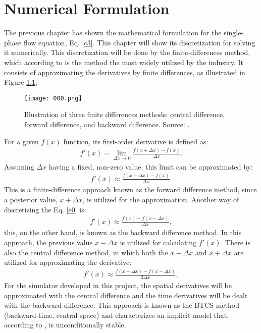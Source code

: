 \chapter{Numerical Formulation}
\label{chapter:NF}
The previous chapter has shown the mathematical formulation for the single-phase flow equation, Eq. \ref{c3}. This chapter will show its discretization for solving it numerically. This discretization will be done by the finite-differences method, which according to \cite{Ertekin2001} is the method the most widely utilized by the industry. It consists of approximating the derivatives by finite differences, as illustrated in Figure \ref{fig:000};
\begin{figure}[H]
	\centering
	\texttt{[image: 000.png]}\\
	\caption{Illustration of three finite differences methods: central difference, forward difference, and backward difference. Source: \cite{Heinzl1977}.}
	\label{fig:000}
\end{figure}
\noindent
For a given $f(x)$ function, its first-order derivative is defined as:
\begin{align}
\label{e0}
f'(x) = \lim_{\Delta x \to 0}\frac{f(x+\Delta x)-f(x)}{\Delta x}.
\end{align}
Assuming $\Delta x$ having a fixed, non-zero value, this limit can be approximated by:
\begin{align}
\label{e00}
f'(x) \approx \frac{f(x+\Delta x)-f(x)}{\Delta x}.
\end{align}
This is a finite-difference approach known as the forward difference method, since a posterior value, $x + \Delta x$, is utilized for the approximation. Another way of discretizing the Eq. \ref{e0} is:
\begin{align}
\label{e000}
f'(x) \approx \frac{f(x)-f(x - \Delta x)}{\Delta x},
\end{align}
this, on the other hand, is known as the backward difference method. In this approach, the previous value $x - \Delta x$ is utilized for calculating $f'(x)$. There is also the central difference method, in which both the $x - \Delta x$ and  $x + \Delta x$ are utilized for approximating the derivative:
\begin{align}
\label{e0000}
f'(x) \approx \frac{f(x + \Delta x)-f(x - \Delta x)}{2 \Delta x},
\end{align}
For the simulator developed in this project, the spatial derivatives will be approximated with the central difference and the time derivatives will be dealt with the backward difference. This approach is known as the BTCS method (backward-time, central-space) and characterizes an implicit model that, according to \cite{Ertekin2001}, is unconditionally stable.

